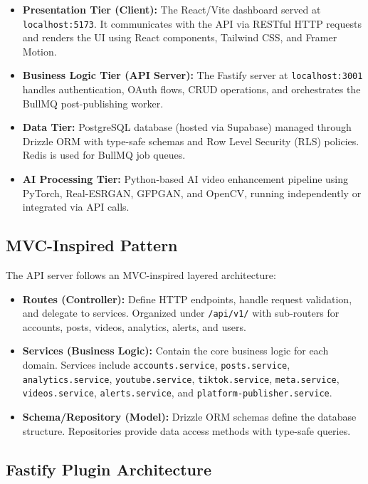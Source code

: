 \begin{itemize}
    \item \textbf{Presentation Tier (Client):} The React/Vite dashboard served at \texttt{localhost:5173}. It communicates with the API via RESTful HTTP requests and renders the UI using React components, Tailwind CSS, and Framer Motion.
    \item \textbf{Business Logic Tier (API Server):} The Fastify server at \texttt{localhost:3001} handles authentication, OAuth flows, CRUD operations, and orchestrates the BullMQ post-publishing worker.
    \item \textbf{Data Tier:} PostgreSQL database (hosted via Supabase) managed through Drizzle ORM with type-safe schemas and Row Level Security (RLS) policies. Redis is used for BullMQ job queues.
    \item \textbf{AI Processing Tier:} Python-based AI video enhancement pipeline using PyTorch, Real-ESRGAN, GFPGAN, and OpenCV, running independently or integrated via API calls.
\end{itemize}

\subsection{MVC-Inspired Pattern}

The API server follows an MVC-inspired layered architecture:

\begin{itemize}
    \item \textbf{Routes (Controller):} Define HTTP endpoints, handle request validation, and delegate to services. Organized under \texttt{/api/v1/} with sub-routers for accounts, posts, videos, analytics, alerts, and users.
    \item \textbf{Services (Business Logic):} Contain the core business logic for each domain. Services include \texttt{accounts.service}, \texttt{posts.service}, \texttt{analytics.service}, \texttt{youtube.service}, \texttt{tiktok.service}, \texttt{meta.service}, \texttt{videos.service}, \texttt{alerts.service}, and \texttt{platform-publisher.service}.
    \item \textbf{Schema/Repository (Model):} Drizzle ORM schemas define the database structure. Repositories provide data access methods with type-safe queries.
\end{itemize}

\subsection{Fastify Plugin Architecture}

